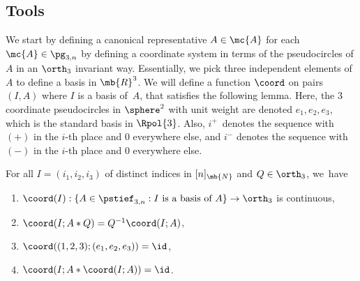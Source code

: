 \subsection{Tools}

We start by defining a canonical representative $A \in \mc{A}$ for each \hbox{$\mc{A} \in \pg_{3,n}$} by defining a coordinate system in terms of the pseudocircles of $A$ in an $\orth_3$ invariant way. Essentially, we pick three independent elements of $A$ to define a basis in $\mb{R}^3$.
We will define a function $\coord$
on pairs $(I,A)$ where $I$ is a basis of~$A$, that satisfies the following lemma.
Here, the $3$ coordinate pseudocircles in $\sphere^2$ with unit weight are denoted $e_1,e_2,e_3$, which is the standard basis in $\Rpol{3}$.
Also, $i^+$~denotes the sequence with $(+)$ in the $i$-th place and $0$ everywhere else, and $i^-$ denotes the sequence with $(-)$ in the $i$-th place and $0$ everywhere else.

\begin{lemma}\label{lemma-basis}
For all $I = (i_1,i_2,i_3)$ of distinct indices in $[n]_\mb{N}$ and $Q \in \orth_3$, we~have
\begin{enumerate}
\item \label{lemma-basis-continuous}
$ \coord(I) : \{A \in \pstief_{3,n} : I \text{ is a basis of } A \} \to \orth_3 $
is continuous,
\item \label{lemma-basis-equivariant}
$\coord(I;A*Q) =Q^{-1}\coord(I;A)$,
\item \label{lemma-basis-identity}
$ \coord((1,2,3);(e_1,e_2,e_3)) = \id$,
\item \label{lemma-basis-idempotent}
$\coord(I;A*\coord(I;A)) = \id$.
\end{enumerate}
\end{lemma}

